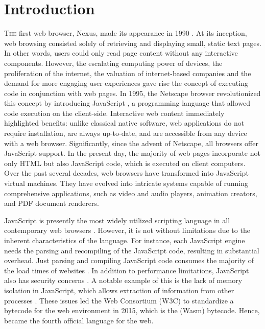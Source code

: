 
\chapter{Introduction}
\label{Intro}


\lettrine[lines=3]{T}{he} first web browser, Nexus, made its appearance in 1990 \cite{nexus}. 
At its inception, web browsing consisted solely of retrieving and displaying small, static text pages. 
In other words, users could only read page content without any interactive components. 
However, the escalating computing power of devices, the proliferation of the internet, the valuation of internet-based companies and the demand for more engaging user experiences gave rise the concept of executing code in conjunction with web pages. 
In 1995, the Netscape browser revolutionized this concept by introducing JavaScript \cite{10.1007/978-3-642-14107-2_7}, a programming language that allowed code execution on the client-side.
Interactive web content immediately highlighted benefits: unlike classical native software, web applications do not require installation, are always up-to-date, and are accessible from any device with a web browser. 
Significantly, since the advent of Netscape, all browsers offer JavaScript support. 
In the present day, the majority of web pages incorporate not only HTML but also JavaScript code, which is executed on client computers. 
Over the past several decades, web browsers have transformed into JavaScript virtual machines. 
They have evolved into intricate systems capable of running comprehensive applications, such as video and audio players, animation creators, and PDF document renderers.

JavaScript is presently the most widely utilized scripting language in all contemporary web browsers \cite{mulazzani2013fast}.
However, it is not without limitations due to the inherent characteristics of the language.
For instance, each JavaScript engine needs the parsing and recompiling of the JavaScript code, resulting in substantial overhead.
Just parsing and compiling JavaScript code consumes the majority of the load times of websites \cite{clark}.
In addition to performance limitations, JavaScript also has security concerns \cite{10.1145/1190216.1190252}.
A notable example of this is the lack of memory isolation in JavaScript, which allows extraction of information from other processes \cite{10.1145/3412841.3442001}.
These issues led the Web Consortium (W3C) to standardize a bytecode for the web environment in 2015, which is the \Wasm(Wasm) bytecode.
Hence, \Wasm became the fourth official language for the web.



